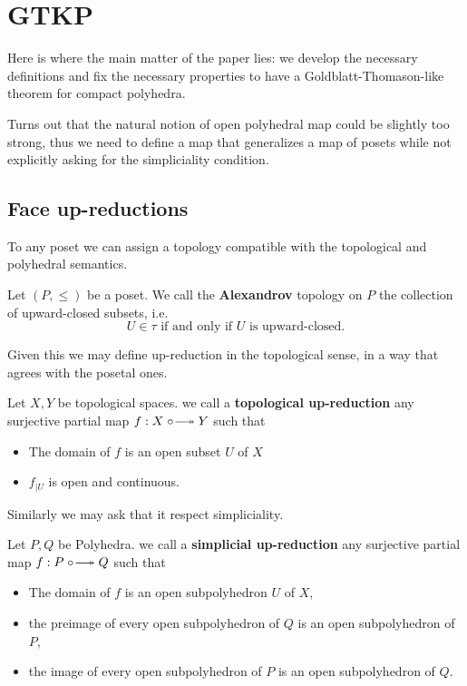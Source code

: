 \section{GTKP}
Here is where the main matter of the paper lies: we develop the necessary definitions and fix the necessary properties to have a 
Goldblatt-Thomason-like theorem for compact polyhedra.

Turns out that the natural notion of open polyhedral map could be slightly too strong, thus we need to define a map that
generalizes a map of posets while not explicitly asking for the simpliciality condition.
\subsection{Face up-reductions}
To any poset we can assign a topology compatible with the topological and polyhedral semantics.

\begin{definition}
    Let $(P,\leq)$ be a poset. We call the \textbf{Alexandrov} topology on $P$ the collection of upward-closed subsets, i.e. 
    \[U\in\tau \text{ if and only if }U \text{ is upward-closed}.\]
\end{definition}

Given this we may define up-reduction in the topological sense, in a way that agrees with the posetal ones.

\begin{definition}
    Let $X,Y$ be topological spaces. we call a \textbf{topological up-reduction} any surjective partial map 
    $f:X\upred Y$ such that
    \begin{itemize}
        \item The domain of $f$ is an open subset $U$ of $X$
        \item $f_{|U}$ is open and continuous.
    \end{itemize}
\end{definition}

Similarly we may ask that it respect simpliciality.
\begin{definition}
    Let $P,Q$ be Polyhedra. we call a \textbf{simplicial up-reduction} any surjective partial map 
    $f:P\upred Q$ such that
    \begin{itemize}
        \item The domain of $f$ is an open subpolyhedron $U$ of $X$,
        \item the preimage of every open subpolyhedron of $Q$ is an open subpolyhedron of $P$,
        \item the image of every open subpolyhedron of $P$ is an open subpolyhedron of $Q$.
    \end{itemize}
\end{definition}

